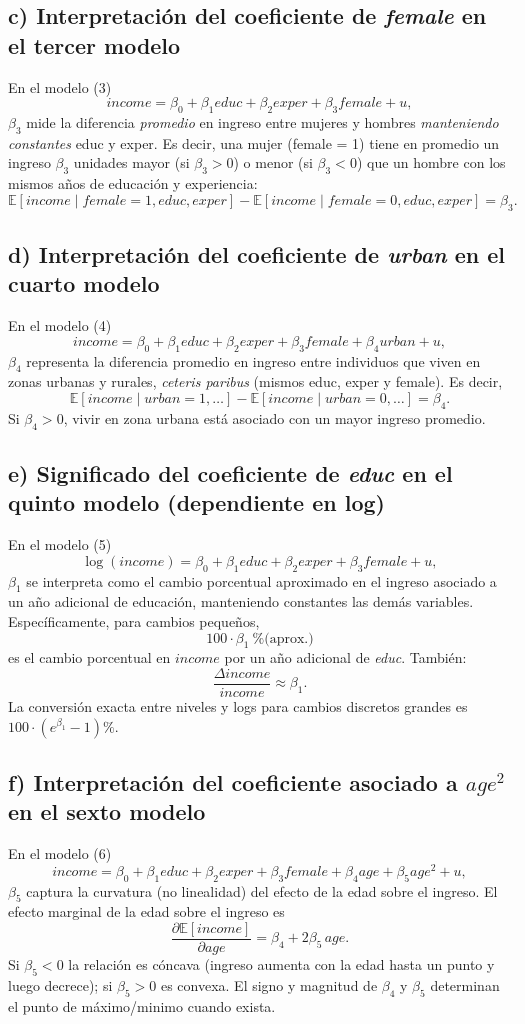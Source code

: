 \documentclass[12pt]{article}
\begin{document}
\subsection*{c) Interpretación del coeficiente de \textit{female} en el tercer modelo}
En el modelo (3)
\[
income = \beta_{0} + \beta_{1}educ + \beta_{2}exper + \beta_{3}female + u,
\]
$\beta_{3}$ mide la diferencia \emph{promedio} en ingreso entre mujeres y hombres \emph{manteniendo constantes} educ y exper. Es decir, una mujer (female = 1) tiene en promedio un ingreso $\beta_{3}$ unidades mayor (si $\beta_{3}>0$) o menor (si $\beta_{3}<0$) que un hombre con los mismos años de educación y experiencia:
\[
\mathbb{E}[income \mid female=1, educ, exper] - \mathbb{E}[income \mid female=0, educ, exper] = \beta_{3}.
\]

\subsection*{d) Interpretación del coeficiente de \textit{urban} en el cuarto modelo}
En el modelo (4)
\[
income = \beta_{0} + \beta_{1}educ + \beta_{2}exper + \beta_{3}female + \beta_{4}urban + u,
\]
$\beta_{4}$ representa la diferencia promedio en ingreso entre individuos que viven en zonas urbanas y rurales, \emph{ceteris paribus} (mismos educ, exper y female). Es decir,
\[
\mathbb{E}[income \mid urban=1,\ldots] - \mathbb{E}[income \mid urban=0,\ldots] = \beta_{4}.
\]
Si $\beta_{4}>0$, vivir en zona urbana está asociado con un mayor ingreso promedio.

\subsection*{e) Significado del coeficiente de \textit{educ} en el quinto modelo (dependiente en log)}
En el modelo (5)
\[
\log(income) = \beta_{0} + \beta_{1}educ + \beta_{2}exper + \beta_{3}female + u,
\]
$\beta_{1}$ se interpreta como el cambio porcentual aproximado en el ingreso asociado a un año adicional de educación, manteniendo constantes las demás variables. Específicamente, para cambios pequeños,
\[
100\cdot \beta_{1}\ \text{\% (aprox.)}
\]
es el cambio porcentual en $income$ por un año adicional de \textit{educ}. También:
\[
 \frac{\Delta income}{income}\approx \beta_{1}.
\]
La conversión exacta entre niveles y logs para cambios discretos grandes es \(100\cdot (e^{\beta_{1}}-1)\%\).

\subsection*{f) Interpretación del coeficiente asociado a $age^{2}$ en el sexto modelo}
En el modelo (6)
\[
income = \beta_{0} + \beta_{1}educ + \beta_{2}exper + \beta_{3}female + \beta_{4}age + \beta_{5}age^{2} + u,
\]
$\beta_{5}$ captura la curvatura (no linealidad) del efecto de la edad sobre el ingreso. El efecto marginal de la edad sobre el ingreso es
\[
\frac{\partial \mathbb{E}[income]}{\partial age} = \beta_{4} + 2\beta_{5}\,age.
\]
Si $\beta_{5}<0$ la relación es cóncava (ingreso aumenta con la edad hasta un punto y luego decrece); si $\beta_{5}>0$ es convexa. El signo y magnitud de $\beta_{4}$ y $\beta_{5}$ determinan el punto de máximo/minimo cuando exista.
\end{document}
